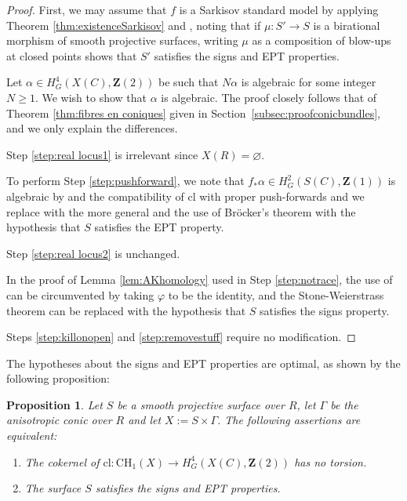 \documentclass[JEP,XML,SOM,Unicode]{cedram}
\theoremstyle{plain}
\newtheorem{prop}[thm]{Proposition}
\theoremstyle{definition}
\numberwithin{equation}{section}
\newcommand{\cl}{{\mathrm{cl}}}
\newcommand{\Z}{{\mathbf Z}}
\newcommand{\CH}{\mathrm{CH}}
\renewcommand{\phi}{\varphi}
\begin{document}
\begin{proof}
First, we may assume that $f$ is a Sarkisov standard model by applying Theorem \ref{thm:existenceSarkisov} and \cite[Prop.\,\ref*{BW1-prop:birinvIHC}]{BW1}, noting that if $\mu:S'\to S$ is a birational morphism of smooth projective surfaces, writing $\mu$ as a composition of blow-ups at closed points shows that $S'$ satisfies the signs and EPT properties.

Let $\alpha\in H^{4}_G(X(C),\Z(2))$ be such that $N\alpha$ is algebraic for some integer $N\geq 1$.
We wish to show that $\alpha$ is algebraic. The proof closely follows that of Theorem \ref{thm:fibres en coniques} given in Section~\ref{subsec:proofconicbundles}, and we only explain the differences.

Step \ref{step:real locus1} is irrelevant since $X(R)=\varnothing$.

To perform Step \ref{step:pushforward}, we note that $f_*\alpha\in H^2_G(S(C),\Z(1))$ is algebraic by \cite[Prop.\,\ref*{BW1-prop:real(1,1)nonarch}]{BW1} and the compatibility of $\cl$ with proper push-forwards \cite[\S \ref*{BW1-subsubsec:eqcl}]{BW1} and we replace
\cite[Satz 22]{WittHasse} with the more general \cite[\S 5]{elmanlamprestel}
and the use of Bröcker's theorem \cite{brocker} with the hypothesis that $S$ satisfies the EPT property.

Step \ref{step:real locus2} is unchanged.

In the proof of Lemma \ref{lem:AKhomology} used in Step \ref{step:notrace}, the use of \cite[Lem.\,9\,(1)]{AKhomology} can be circumvented by taking $\phi$ to be the identity, and the Stone-Weierstrass theorem can be replaced with the hypothesis that $S$ satisfies the signs property.

Steps \ref{step:killonopen} and \ref{step:removestuff} require no modification.
\end{proof}

The hypotheses about the signs and EPT properties are optimal, as shown by the following proposition:

\begin{prop}
\label{prop:IHCconicbundlesnonarch}
Let $S$ be a smooth projective surface over $R$, let $\Gamma$ be the anisotropic conic over $R$ and let $X:=S\times\Gamma$. The following assertions are equivalent:
\begin{enumerate}
\item\label{prop:IHCconicbundlesnonarchi} The cokernel of $\cl:\CH_1(X)\to H^4_G(X(C),\Z(2))$ has no torsion.
\item\label{prop:IHCconicbundlesnonarchii} The surface $S$ satisfies the signs and EPT properties.
\end{enumerate}
\end{prop}
\end{document}
